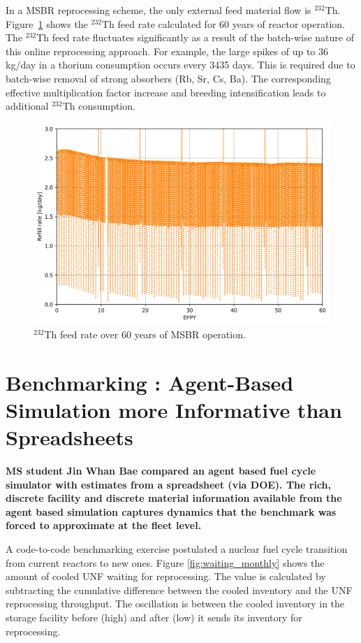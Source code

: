\documentclass{article}
\begin{document}
In a \gls{MSBR} reprocessing scheme, the only external feed material flow  is
$^{232}$Th. Figure~\ref{fig:th_refill} shows the $^{232}$Th feed rate
calculated for 60 years of reactor operation. The $^{232}$Th feed rate
fluctuates significantly as a result of the batch-wise nature of this online
reprocessing approach. For example, the large spikes of up to 36 kg/day in a
thorium consumption occurs every 3435 days. This is required due to batch-wise
removal of strong absorbers (Rb, Sr, Cs, Ba). The corresponding effective
multiplication factor increase and breeding
intensification leads to additional $^{232}$Th consumption.

\begin{figure}[ht!] %
  \includegraphics[width=\textwidth]{Th_refill_rate.png} \caption{$^{232}$Th
  feed rate over 60 years of \gls{MSBR} operation.}
  \label{fig:th_refill}
\end{figure}

\FloatBarrier
\section*{Benchmarking : Agent-Based Simulation more Informative than Spreadsheets \cite{bae_standardized_2018}}
\textbf{MS student Jin Whan Bae compared an agent based fuel cycle simulator 
        with estimates from a spreadsheet (via DOE). The rich, discrete 
        facility and discrete material information available from the agent 
based simulation captures dynamics that the benchmark was forced to approximate 
at the fleet level.}

A code-to-code benchmarking exercise postulated a nuclear fuel cycle transition 
from current reactors to new ones. 
Figure \ref{fig:waiting_monthly} shows the amount of cooled \gls{UNF} waiting 
for
reprocessing. The value is calculated by subtracting the cumulative difference 
between
the cooled inventory and the \gls{UNF} reprocessing throughput.
The oscillation is between the cooled inventory in the storage facility before 
(high)
and after (low) it sends its inventory for reprocessing.
\end{document}
